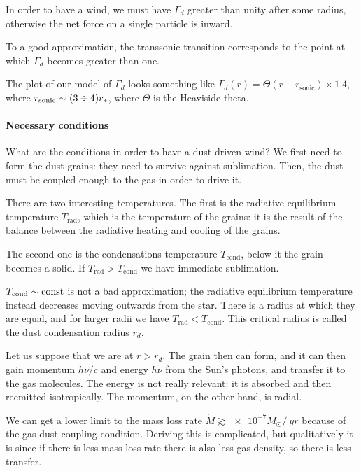 \documentclass[main.tex]{subfiles}
\begin{document}
In order to have a wind, we must have \(\Gamma_{d}\) greater than unity after some radius, otherwise the net force on a single particle is inward.

To a good approximation, the transsonic transition corresponds to the point at which \(\Gamma_{d}\) becomes greater than one. 

The plot of our model of \(\Gamma_{d}\) looks something like \(\Gamma_{d} (r) = \Theta (r - r _{\text{sonic}}) \times 1.4\), where \(r _{\text{sonic}} \sim (3 \divisionsymbol 4) r_{*}\), where \(\Theta \) is the Heaviside theta.

\paragraph{Necessary conditions}

What are the conditions in order to have a dust driven wind? We first need to form the dust grains: they need to survive against sublimation. 
Then, the dust must be coupled enough to the gas in order to drive it. 

There are two interesting temperatures. The first is the radiative equilibrium temperature \(T _{\text{rad}}\), which is the temperature of the grains: it is the result of the balance between the radiative heating and cooling of the grains. 

The second one is the condensations temperature \(T _{\text{cond}}\), below it the grain becomes a solid. 
If \(T _{\text{rad}} >  T _{\text{cond}}\) we have  immediate sublimation.

\(T _{\text{cond}} \sim \text{const}\) is not a bad approximation; the radiative equilibrium temperature instead decreases moving outwards from the star. 
There is a radius at which they are equal, and for larger radii we have \(T _{\text{rad}} < T _{\text{cond}}\). 
This critical radius is called the dust condensation radius \(r_{d}\). 

Let us suppose that we are at \(r > r_d\). 
The grain then can form, and it can then gain momentum \(h \nu /c\) and energy \(h \nu \) from the Sun's photons, and transfer it to the gas molecules. 
The energy is not really relevant: it is absorbed and then reemitted isotropically. The momentum, on the other hand, is radial.

We can get a lower limit to the mass loss rate \(\dot{M} \gtrsim \num{e-7} M_{\odot} / \SI{}{yr}\) because of the gas-dust coupling condition.
Deriving this is complicated, but qualitatively it is since if there is less mass loss rate there is also less gas density, so there is less transfer. 
\end{document}
